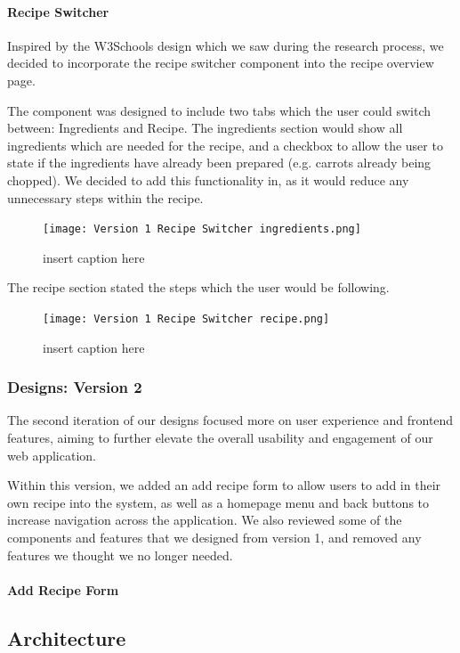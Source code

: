 \documentclass{article}
\begin{document}
\paragraph{Recipe Switcher}
Inspired by the W3Schools design which we saw during the research process, we decided to incorporate the recipe switcher component into the recipe overview page.

The component was designed to include two tabs which the user could switch between: Ingredients and Recipe. The ingredients section would show all ingredients which are needed for the recipe, and a checkbox to allow the user to state if the ingredients have already been prepared (e.g. carrots already being chopped). We decided to add this functionality in, as it would reduce any unnecessary steps within the recipe.

\begin{figure}[htbp]
  \texttt{[image: Version 1 Recipe Switcher ingredients.png]}
  \centering
  \caption{insert caption here}
\end{figure}

The recipe section stated the steps which the user would be following. 

\begin{figure}[htbp]
  \texttt{[image: Version 1 Recipe Switcher recipe.png]}
  \centering
  \caption{insert caption here}
\end{figure}

\subsubsection{Designs: Version 2}
The second iteration of our designs focused more on user experience and frontend features, aiming to further elevate the overall usability and engagement of our web application.

Within this version, we added an add recipe form to allow users to add in their own recipe into the system, as well as a homepage menu and back buttons to increase navigation across the application. We also reviewed some of the components and features that we designed from version 1, and removed any features we thought we no longer needed.

\paragraph{Add Recipe Form}

    \subsection{Architecture}
\end{document}
